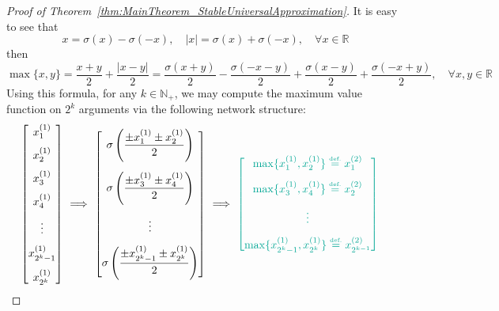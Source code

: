 \documentclass{article}
\numberwithin{equation}{section}
\theoremstyle{definition}
\newcommand{\eqdef}{\ensuremath{\stackrel{\mbox{\upshape\tiny def.}}{=}}}
\begin{document}
\begin{proof}[{Proof of Theorem~\ref{thm:MainTheorem_StableUniversalApproximation}}]
It is easy to see that
$$x=\sigma(x)-\sigma(-x), \quad |x|=\sigma(x)+\sigma(-x),
\quad \forall x\in\mathbb{R}$$
then 
$$\max\{x,y\} = \frac{x+y}{2} + \frac{|x-y|}{2} = \frac{\sigma(x+y)}{2} - \frac{\sigma(-x-y)}{2} + \frac{\sigma(x-y)}{2} + \frac{\sigma(-x+y)}{2},
\quad \forall x,y\in\mathbb{R}$$
Using this formula, for any $k\in\mathbb{N}_+$, we may compute the maximum value function on $2^k$ arguments via the following network structure:
\begin{align}
\label{eq:max_network_structure}
    \begin{bmatrix} x_1^{(1)} \\ \vspace{-5pt} \\ x_2^{(1)} \\ \vspace{-5pt} \\ x_3^{(1)} \\ \vspace{-5pt} \\ x_4^{(1)} \\ \vspace{-5pt} \\ \vdots \\ \vspace{-5pt} \\ x_{2^k-1}^{(1)} \\ \vspace{-5pt} \\ x_{2^k}^{(1)} \end{bmatrix}
    \ &\Longrightarrow \
    \begin{bmatrix} 
        \displaystyle
        \sigma\left(\frac{\pm x_1^{(1)} \pm x_2^{(1)}}{2}\right) \\ 
        \vspace{-3pt} \\ 
        \displaystyle
        \sigma\left(\frac{\pm x_3^{(1)} \pm x_4^{(1)}}{2}\right) \\ 
        \vspace{-3pt} \\ \vdots \\ \vspace{-3pt} \\ 
        \displaystyle
        \sigma\left(\frac{\pm x_{2^k-1}^{(1)} \pm x_{2^k}^{(1)}}{2}\right)
    \end{bmatrix}
    \ \Longrightarrow \
    {\color{persiangreen}
    \begin{bmatrix} \max\{x_1^{(1)},x_2^{(1)}\} \eqdef x_1^{(2)} \\ \vspace{-3pt} \\ \max\{x_3^{(1)},x_4^{(1)}\} \eqdef x_2^{(2)} \\ \vspace{-3pt} \\ \vdots \\ \vspace{-3pt} \\ \max\{x_{2^k-1}^{(1)},x_{2^k}^{(1)}\} \eqdef x_{2^{k-1}}^{(2)} \end{bmatrix}
}
\end{align}
\end{proof}
\end{document}
